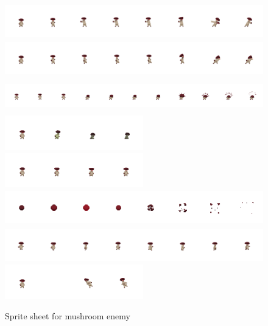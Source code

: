 \documentclass{article}
\begin{document}
\begin{figure}[H]
\centering
\includegraphics[height = 1.5cm]{mushroom_Attack}
\includegraphics[height = 1.5cm]{mushroom_Attack2}
\includegraphics[height = 1.5cm]{mushroom_Attack3}
\includegraphics[height = 1.5cm]{mushroom_Death}
\includegraphics[height = 1.5cm]{mushroom_Idle}
\includegraphics[height = 1.5cm]{mushroom_Projectile_sprite}
\includegraphics[height = 1.5cm]{mushroom_Run}
\includegraphics[height = 1.5cm]{mushroom_Take Hit}
\caption{Sprite sheet for mushroom enemy}
\label{mushroom_sprite}
\end{figure}
\end{document}
